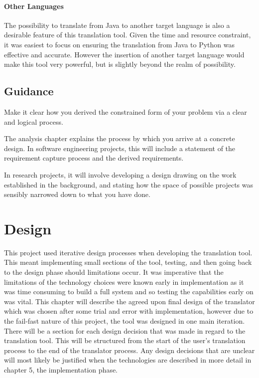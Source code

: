 \documentclass{l4proj}
\begin{document}
\subsubsection{Other Languages}
The possibility to translate from Java to another target language is also a desirable feature of this translation tool. Given the time and resource constraint, it was easiest to focus on ensuring the translation from Java to Python was effective and accurate. However the insertion of another target language would make this tool very powerful, but is slightly beyond the realm of possibility.




\section{Guidance}
Make it clear how you derived the constrained form of your problem via a clear and logical process. 

The analysis chapter explains the process by which you arrive at a concrete design. In software 
engineering projects, this will include a statement of the requirement capture process and the
derived requirements.

In research projects, it will involve developing a design drawing on
the work established in the background, and stating how the space of possible projects was
sensibly narrowed down to what you have done.

\chapter{Design}
This project used iterative design processes when developing the translation tool. This meant implementing small sections of the tool, testing, and then going back to the design phase should limitations occur. It was imperative that the limitations of the technology choices were known early in implementation as it was time consuming to build a full system and so testing the capabilities early on was vital. This chapter will describe the agreed upon final design of the translator which was chosen after some trial and error with implementation, however due to the fail-fast nature of this project, the tool was designed in one main iteration. There will be a section for each design decision that was made in regard to the translation tool. This will be structured from the start of the user's translation process to the end of the translator process. Any design decisions that are unclear will most likely be justified when the technologies are described in more detail in chapter 5, the implementation phase.
\end{document}

